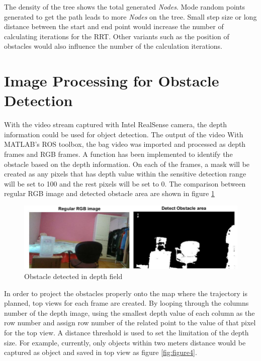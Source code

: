 \documentclass[
  oneside]{ubcthesis}
\begin{document}
The density of the tree shows the total generated \emph{Nodes}. Mode random points generated to get the path leads to more \emph{Nodes} on the tree. Small step size or long distance between the start and end point would increase the number of calculating iterations for the RRT. Other variants such as the position of obstacles would also influence the number of the calculation iterations.

\hypertarget{image-processing-for-obstacle-detection}{%
\section{Image Processing for Obstacle Detection}\label{image-processing-for-obstacle-detection}}

With the video stream captured with Intel RealSense camera, the depth information could be used for object detection. The output of the video With MATLAB's ROS toolbox, the bag video was imported and processed as depth frames and RGB frames. A function has been implemented to identify the obstacle based on the depth information. On each of the frames, a mask will be created as any pixels that has depth value within the sensitive detection range will be set to 100 and the rest pixels will be set to 0. The comparison between regular RGB image and detected obstacle area are shown in figure \ref{fig:figure3}

\begin{figure}

{\centering \includegraphics[width=0.8\linewidth]{figures/3} 

}

\caption{Obstacle detected in depth field}\label{fig:figure3}
\end{figure}



In order to project the obstacles properly onto the map where the trajectory is planned, top views for each frame are created. By looping through the columns number of the depth image, using the smallest depth value of each column as the row number and assign row number of the related point to the value of that pixel for the top view. A distance threshold is used to set the limitation of the depth size. For example, currently, only objects within two meters distance would be captured as object and saved in top view as figure \ref{fig:figure4}.
\end{document}
